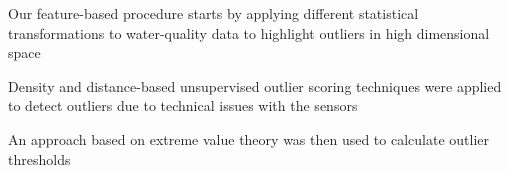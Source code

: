 \documentclass[draft]{agujournal2018} %
\begin{document}






\begin{keypoints}
\item  Our feature-based procedure  starts by applying different statistical transformations to water-quality data to highlight outliers in high dimensional space
\item  Density and distance-based unsupervised outlier scoring techniques were  applied to detect outliers due to technical issues with the sensors
\item  An approach based on extreme value theory was then used to calculate outlier thresholds
\end{keypoints}



%
%
\end{document}
